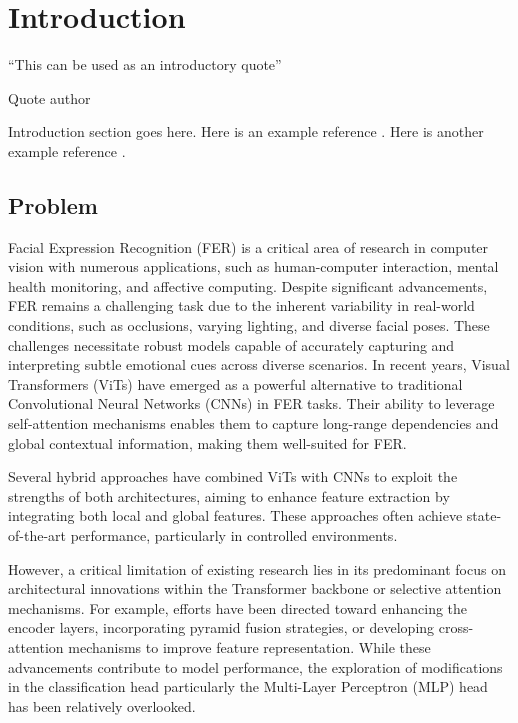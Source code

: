 \chapter{Introduction}
\label{chapter:introduction}


\epigraph{``This can be used as an introductory quote''}{Quote author}

\newpage

Introduction section goes here. Here is an example reference
\cite{examplereference}. Here is another example reference \cite{examplereference2}.

\newpage

\section{Problem}


Facial Expression Recognition (FER) is a critical area of research in computer
vision with numerous applications, such as human-computer interaction, mental
health monitoring, and affective computing. Despite significant advancements, FER
remains a challenging task due to the inherent variability in real-world conditions,
such as occlusions, varying lighting, and diverse facial poses. These challenges
necessitate robust models capable of accurately capturing and interpreting subtle
emotional cues across diverse scenarios.
In recent years, Visual Transformers (ViTs) have emerged as a powerful alternative
to traditional Convolutional Neural Networks (CNNs) in FER tasks. Their ability to leverage self-attention mechanisms enables them to capture long-range dependencies
and global contextual information, making them well-suited for FER.

Several hybrid approaches have combined ViTs with CNNs to exploit the strengths of both architectures, aiming to enhance feature extraction by integrating both local
and global features. These approaches often achieve state-of-the-art performance, particularly in controlled environments.

However, a critical limitation of existing research lies in its predominant focus on architectural innovations within the Transformer backbone or selective attention
mechanisms. For example, efforts have been directed toward enhancing the encoder layers, incorporating pyramid fusion strategies, or developing cross-attention
mechanisms to improve feature representation. While these advancements contribute to model performance, the exploration of modifications in the classification head
particularly the Multi-Layer Perceptron (MLP) head has been relatively overlooked.


